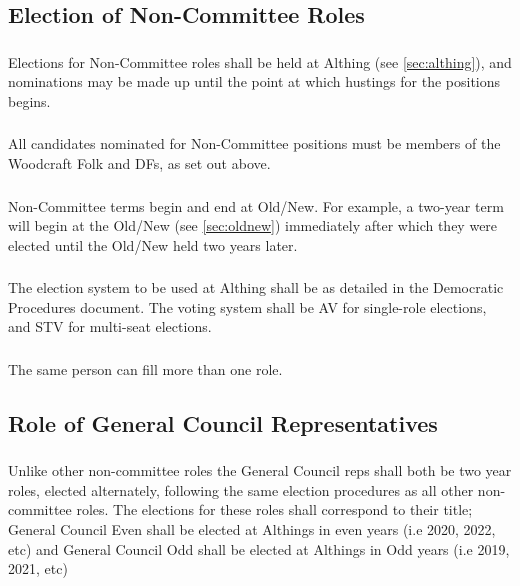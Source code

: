 \documentclass[a4paper, 11pt]{report}
\begin{document}
\subsection{Election of Non-Committee Roles}

\subsubsection{}
Elections for Non-Committee roles shall be held at Althing (see \ref{sec:althing}), and nominations may be made up until the point at which hustings for the positions begins.

\subsubsection{}
All candidates nominated for Non-Committee positions must be members of the Woodcraft Folk and DFs, as set out above.

\subsubsection{}
Non-Committee terms begin and end at Old/New.  For example, a two-year term will begin at the Old/New (see \ref{sec:oldnew}) immediately after which they were elected until the Old/New held two years later.

\subsubsection{}
The election system to be used at Althing shall be as detailed in the Democratic Procedures document.  The voting system shall be AV for single-role elections, and STV for multi-seat elections.

\subsubsection{}
The same person can fill more than one role.

\subsection{Role of General Council Representatives}
\label{sec:noncomgeneralcouncil}
\subsubsection{}
Unlike other non-committee roles the General Council reps shall both be two year roles, elected alternately, following the same election procedures as all other non-committee roles. The elections for these roles shall correspond to their title; General Council Even shall be elected at Althings in even years (i.e 2020, 2022, etc) and General Council Odd shall be elected at Althings in Odd years (i.e 2019, 2021, etc)
\end{document}
